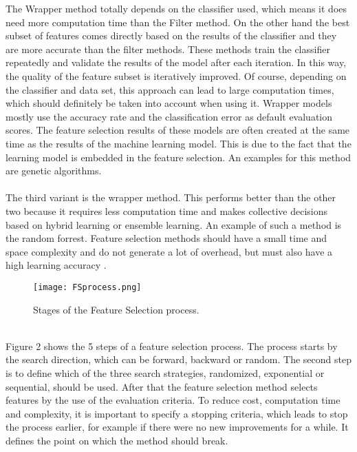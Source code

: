 \documentclass[../masterarbeit.tex]{subfiles}
\begin{document}
The Wrapper method totally depends on the classifier used, which means it does need more computation time than the Filter method. On the other hand the best subset of features comes directly based on the results of the classifier and they are more accurate than the filter methods. \autocite[]{VenkateshAnuradha:2019} \textcite[]{CAI201870} These methods train the classifier repeatedly and validate the results of the model after each iteration. In this way, the quality of the feature subset is iteratively improved. Of course, depending on the classifier and data set, this approach can lead to large computation times, which should definitely be taken into account when using it. \autocite[]{PISNER2020101}
Wrapper models mostly use the accuracy rate and the classification error as default evaluation scores. The feature selection results of these models are often created at the same time as the results of the machine learning model. This is due to the fact that the learning model is embedded in the feature selection. \autocite[]{CAI201870}
An examples for this method are genetic algorithms. \\~\\
The third variant is the wrapper method. This performs better than the other two because it requires less computation time and makes collective decisions based on hybrid learning or ensemble learning. An example of such a method is the random forrest. \autocite[]{VenkateshAnuradha:2019} \textcite[]{CAI201870}
Feature selection methods should have a small time and space complexity and do not generate a lot of overhead, but must also have a high learning accuracy  \textcite[]{CAI201870}.
\\
\begin{figure}[h]
    \centering
    \texttt{[image: FSprocess.png]}
    \caption{ Stages of the Feature Selection process.} 
\end{figure}
\\
Figure 2 shows the 5 steps of a feature selection process. The process starts by the search direction, which can be forward, backward or random. The second step is to define which of the three search strategies, randomized,  exponential  or  sequential, should be used. After that the feature selection method selects features by the use of the evaluation criteria. To reduce cost, computation time and complexity, it is important to specify a stopping criteria, which leads to stop the process earlier, for example if there were no new improvements for a while. It defines the point on which the method should break. \autocite[]{VenkateshAnuradha:2019}
\end{document}
